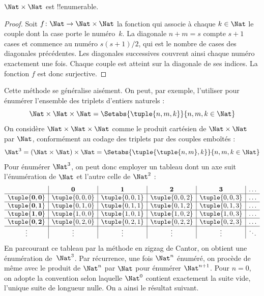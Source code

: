 \documentclass[../../../include/open-logic-section]{subfiles}
\begin{document}
\begin{prop}
$\Nat \times \Nat$ est !!{enumerable}.
\end{prop}

\begin{proof}
Soit $f \colon \Nat \to \Nat\times\Nat$ la fonction qui associe
à chaque $k \in \Nat$ le couple dont la case porte le numéro~$k$.
La diagonale $n+m=s$ compte $s+1$ cases et commence au numéro
$s(s+1)/2$, qui est le nombre de cases des diagonales précédentes.
Les diagonales successives couvrent ainsi chaque numéro exactement
une fois. Chaque couple est atteint sur la diagonale de ses indices.
La fonction $f$ est donc surjective.
\end{proof}

\begin{explain}
Cette méthode se généralise aisément. On peut, par exemple,
l’utiliser pour énumérer l’ensemble des triplets d’entiers naturels :
\[
\Nat \times \Nat \times \Nat = \Setabs{\tuple{n,m,k}}{n,m,k \in \Nat}
\]
On considère $\Nat \times \Nat \times \Nat$ comme le produit
cartésien de $\Nat \times \Nat$ par $\Nat$, conformément au codage
des triplets par des couples emboîtés :
\[
\Nat^3 = (\Nat \times \Nat) \times \Nat =
\Setabs{\tuple{\tuple{n,m},k}}{n, m, k
  \in \Nat }
\]
Pour énumérer $\Nat^3$, on peut donc employer un tableau dont
un axe suit l’énumération de $\Nat$ et l’autre celle de $\Nat^2$ :
\[
\begin{array}{ c | c | c | c | c | c}
& \mathbf 0 & \mathbf 1 & \mathbf 2 & \mathbf 3 & \dots \\
\hline
\mathbf{\tuple{0,0}} & \tuple{0,0,0} & \tuple{0,0,1} & \tuple{0,0,2} & \tuple{0,0,3} & \dots \\
\hline
\mathbf{\tuple{0,1}} & \tuple{0,1,0} & \tuple{0,1,1} & \tuple{0,1,2} & \tuple{0,1,3} & \dots \\
\hline
\mathbf{\tuple{1,0}} & \tuple{1,0,0} & \tuple{1,0,1} & \tuple{1,0,2} & \tuple{1,0,3} & \dots \\
\hline
\mathbf{\tuple{0,2}} & \tuple{0,2,0} & \tuple{0,2,1} & \tuple{0,2,2} & \tuple{0,2,3} & \dots\\
\hline
\vdots & \vdots & \vdots & \vdots & \vdots & \ddots \\
\end{array}
\]
En parcourant ce tableau par la méthode en zigzag de Cantor,
on obtient une énumération de~$\Nat^3$. Par récurrence, une fois
$\Nat^n$ énuméré, on procède de même avec le produit de $\Nat^n$
par $\Nat$ pour énumérer $\Nat^{n+1}$. Pour $n=0$, on adopte
la convention selon laquelle $\Nat^0$ contient exactement
la suite vide, l’unique suite de longueur nulle.
%
%
On a ainsi le résultat suivant.
\end{explain}
\end{document}

